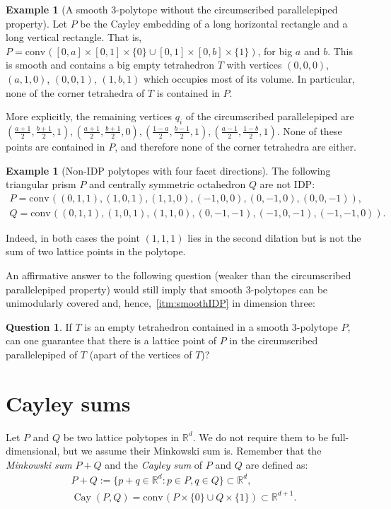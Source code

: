 \documentclass{amsart}
\theoremstyle{plain}
\theoremstyle{definition}
\newtheorem{example}[theorem]{Example}
\newtheorem{question}[theorem]{Question}
\newcommand{\R}{ \ensuremath{\mathbb{R}}}
\newcommand{\conv}{\ensuremath{\mathrm{conv}}\hspace{1pt}}
\newcommand{\cayley}{\operatorname{Cay}}
\begin{document}
\begin{example}[A smooth 3-polytope without the circumscribed parallelepiped property]
 Let $P$ be the Cayley embedding of a long horizontal rectangle and a long vertical rectangle. That is,
$P=\conv([0,a]\times [0,1] \times\{0\} \cup [0,1]\times [0,b] \times\{1\})$, for big $a$ and $b$. This is smooth and contains a big empty tetrahedron $T$ with vertices $(0,0,0)$, $(a,1,0)$, $(0,0,1)$, $(1,b,1)$ which occupies most of its volume. In particular, none of the corner tetrahedra of $T$ is contained in $P$. 

More explicitly, the remaining vertices $q_i$ of the circumscribed parallelepiped are $(\frac{a+1}{2}, \frac{b+1}{2}, 1), (\frac{a+1}{2}, \frac{b+1}{2}, 0), (\frac{1-a}{2}, \frac{b-1}{2}, 1), (\frac{a-1}{2}, \frac{1-b}{2}, 1)$. None of these points are contained in $P$, and therefore none of the corner tetrahedra are either.
\end{example}


\begin{example}[Non-IDP polytopes with four facet directions]
\label{ex:non-IDP}
The following triangular prism $P$ and centrally symmetric octahedron $Q$ are not IDP:
\begin{gather}
P=\conv((0,1,1),(1,0,1),(1,1,0),(-1,0,0),(0,-1,0),(0,0,-1)),\\
Q= \conv((0,1,1),(1,0,1),(1,1,0),(0,-1,-1),(-1,0,-1),(-1,-1,0)).
\end{gather}

Indeed, in both cases the 
point $(1,1,1)$ lies in the second dilation but is not the sum of two lattice points in the polytope. 
\end{example}

An affirmative answer to the following question (weaker than the circumscribed parallelepiped property) would still  imply that smooth $3$-polytopes can be unimodularly covered and, hence,~\eqref{itm:smoothIDP} in dimension three:

\begin{question}
If $T$ is an empty tetrahedron contained in a smooth 3-polytope $P$, can one guarantee that there is a lattice point of $P$ in the circumscribed parallelepiped of $T$ (apart of the vertices of $T$)?
\end{question}




\section{ Cayley sums}
\label{sec:cayley}
Let $P$ and $Q$ be two lattice polytopes in $\R^d$. We do not require them to be full-dimensional, but we assume their Minkowski sum is. Remember that the \emph{Minkowski sum} $P+Q$ and the \emph{Cayley sum} of $P$ and $Q$ are defined as:
\begin{gather*}
P + Q := \{ p+q \in \R^d: p\in P, q \in Q\} \subset \R^d,\\
\cayley (P,Q) = \conv( P\times\{0\} \cup Q\times \{1\}) \subset \R^{d+1}.
\end{gather*}
\end{document}
